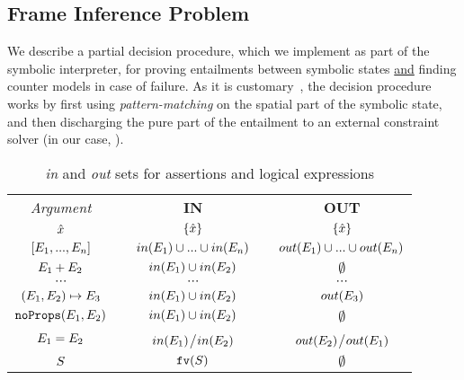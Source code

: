 \subsection{Frame Inference Problem}\label{subsec:fip}

We describe a partial decision procedure, which we  
implement as part of the \jsil symbolic interpreter, for proving entailments 
between symbolic states \underline{and} finding counter 
models in case of failure.  
As it is customary~\cite{javert,jacobs2011verifast,sepwithsmt}, the decision procedure works by first using \emph{pattern-matching} 
on the spatial part of the symbolic state, and then discharging the pure part of the 
entailment to an external constraint solver (in our case, \rosette). 

\begin{table} 
{\small \begin{tabular}{@{}c@{}ccc@{}c@{}}\toprule
\emph{Argument} & & \textbf{IN}  & & \textbf{OUT}  \\
\cmidrule{1-1} \cmidrule{3-3} \cmidrule{5-5}

$\hat{x}$                                                       & & $\{ \hat{x} \}$                                                          & & $\{ \hat{x} \}$    \\
$[ E_1, ..., E_n ]$                     & & $in(E_1) \cup ... \cup in(E_n)$      & & $out(E_1) \cup ... \cup out(E_n)$ \\
$E_1 + E_2$                                    & & $in(E_1) \cup in(E_2)$                  & & $\emptyset$ \\
$\cdots$ & & $\cdots$ & & $\cdots$ \\[1pt]
$(E_1, E_2)\mapsto E_3$   & & $in(E_1) \cup in(E_2)$ & & $out(E_3)$  \\
%
$\texttt{noProps}(E_1, E_2)$           &  & $in(E_1) \cup in(E_2)$ & & $\emptyset$ \\
%
$E_1 = E_2$                               & & $in(E_1)$/$in(E_2)$      & & $out(E_2)$/$out(E_1)$ \\
%
$S$                                                    & & $\texttt{fv}(S)$                                           & & $\emptyset$ \\
\bottomrule
\end{tabular}}
\caption{\emph{in} and \emph{out} sets for assertions and logical expressions}
\vspace{-25pt}
\end{table}

